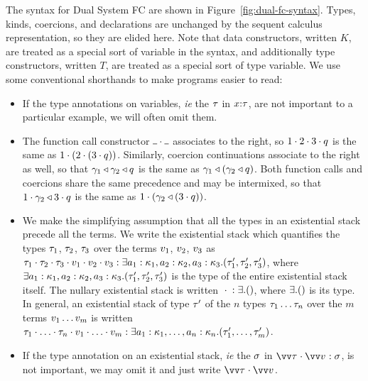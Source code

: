 \documentclass{article}
\begin{document}
The syntax for Dual System FC are shown in Figure~\ref{fig:dual-fc-syntax}.
Types, kinds, coercions, and declarations are unchanged by the sequent calculus
representation, so they are elided here.  Note that data constructors, written
$K$, are treated as a special sort of variable in the syntax, and additionally
type constructors, written $T$, are treated as a special sort of type variable.
We use some conventional shorthands to make programs easier to read:
\begin{itemize}
\item If the type annotations on variables, \emph{ie} the $\tau$ in $x{:}{\tau}$,
  are not important to a particular example, we will often omit them.

\item The function call constructor $\app{\blank}{\blank}$ associates to the
  right, so ${1}\cdot{{2}\cdot{{3}\cdot{q}}}$ is the same as
  ${1}\cdot{({2}\cdot{({3}\cdot{q})})}$.  Similarly, coercion continuations
  associate to the right as well, so that ${\gamma_1}\triangleleft{{\gamma_2}\triangleleft{q}}$ is
  the same as ${\gamma_1}\triangleleft{({\gamma_2}\triangleleft{q})}$.  Both function calls and
  coercions share the same precedence and may be intermixed, so that
  ${1}\cdot{{\gamma_2}\triangleleft{{3}\cdot{q}}}$ is the same as
  ${1}\cdot{({\gamma_2}\triangleleft{({3}\cdot{q})})}$.

\item We make the simplifying assumption that all the types in an existential
  stack precede all the terms.  We write the existential stack which quantifies
  the types $\tau_1$, $\tau_2$, $\tau_3$ over the terms $v_1$, $v_2$, $v_3$
  as
  $\packs[\stackty{a_1:\ki_1,a_2:\ki_2,a_3:\ki_3}{\ty'_1,\ty'_2,\ty'_3}]{\pack{\ty_1}{\pack{\ty_2}{\ty_3}}}{\pack{\tm_1}{\pack{\tm_2}{\tm_3}}}$,
  where $\exists{a_1:\kappa_1,a_2:\kappa_2,a_3:\kappa_3}.({\tau'_1,\tau'_2,\tau'_3})$ is the
  type of the entire existential stack itself.  The nullary existential stack is
  written $\packs[\stackty{}{}]{}{}$,
  where $\exists{}.({})$
  is its type.  In general, an existential stack of type $\tau'$ of the $n$ types
  $\tau_1\dots\tau_n$ over the $m$ terms $v_1\dots v_m$ is written
  $\packs[\stackty{a_1:\ki_1,\dots,a_n:\ki_n}{\ty'_1,\dots,\ty'_m}]{\pack{\ty_1}{\pack{\dots}{\ty_n}}}{\pack{\tm_1}{\pack{\dots}{\tm_m}}}$.

\item If the type annotation on an existential stack, \emph{ie} the $\sigma$ in
  $\packs[\sty]{\vect{\ty}}{\vect{\tm}}$, is not important, we may omit it and
  just write $\packs{\vect{\ty}}{\vect{\tm}}$.


\end{itemize}
\end{document}
